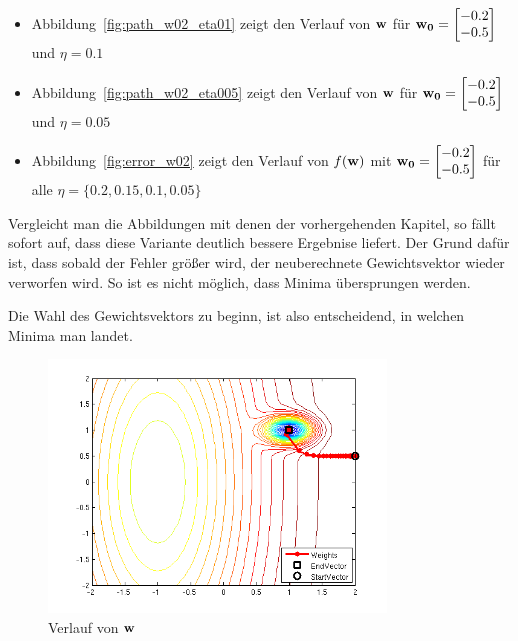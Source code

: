 \begin{itemize}
  \item Abbildung~\ref{fig:path_w02_eta01} zeigt den Verlauf von $\mathbf{w}$ für $\mathbf{w_0} = \begin{bmatrix} -0.2 \\ -0.5 \end{bmatrix}$ und $\eta = 0.1$
  \item Abbildung~\ref{fig:path_w02_eta005} zeigt den Verlauf von $\mathbf{w}$ für $\mathbf{w_0} = \begin{bmatrix} -0.2 \\ -0.5 \end{bmatrix}$ und $\eta = 0.05$
  \item Abbildung~\ref{fig:error_w02} zeigt den Verlauf von $f(\mathbf{w})$ mit $\mathbf{w_0} = \begin{bmatrix} -0.2 \\ -0.5 \end{bmatrix}$ für alle $\eta = \{0.2, 0.15, 0.1, 0.05\}$
\end{itemize}

Vergleicht man die Abbildungen mit denen der vorhergehenden Kapitel, so fällt sofort auf, dass diese
Variante deutlich bessere Ergebnise liefert. Der Grund dafür ist, dass sobald der Fehler größer wird,
der neuberechnete Gewichtsvektor wieder verworfen wird. So ist es nicht möglich, dass Minima übersprungen
werden.

Die Wahl des Gewichtsvektors zu beginn, ist also entscheidend, in welchen Minima man landet.

\begin{figure}[h!]
  \centering
  \includegraphics[width=0.8\textwidth]{./figures/213/path_w01_eta02.png}
  \caption{Verlauf von $\mathbf{w}$}
  \label{fig:path_w01_eta02}
\end{figure}

